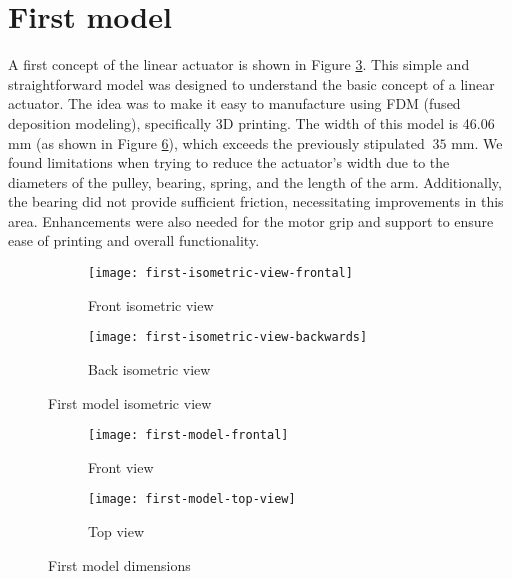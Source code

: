 \section{First model}

A first concept of the linear actuator is shown in Figure \ref{fig:first-isometric-view}. This simple and straightforward model was designed to understand the basic concept of a linear actuator. The idea was to make it easy to manufacture using FDM (fused deposition modeling), specifically 3D printing. The width of this model is 46.06 mm (as shown in Figure \ref{fig:first-model-dimensions}), which exceeds the previously stipulated $~35$ mm. We found limitations when trying to reduce the actuator's width due to the diameters of the pulley, bearing, spring, and the length of the arm. Additionally, the bearing did not provide sufficient friction, necessitating improvements in this area. Enhancements were also needed for the motor grip and support to ensure ease of printing and overall functionality.

\begin{figure}[H]
    \centering
    \begin{subfigure}[b]{0.4\textwidth}
        \texttt{[image: first-isometric-view-frontal]}
        \caption{Front isometric view}
        \label{fig:first-front-isometric-view}
    \end{subfigure}
    \begin{subfigure}[b]{0.4\textwidth}
        \texttt{[image: first-isometric-view-backwards]}
        \caption{Back isometric view}
        \label{fig:first-back-isometric-view}
    \end{subfigure}
    \caption{First model isometric view}
    \label{fig:first-isometric-view}
\end{figure}

\begin{figure}[H]
    \centering
    \begin{subfigure}[b]{0.272\textwidth}
        \texttt{[image: first-model-frontal]}
        \caption{Front view}
        \label{fig:first-model-frontal}
    \end{subfigure}
    \begin{subfigure}[b]{0.628\textwidth}
        \texttt{[image: first-model-top-view]}
        \caption{Top view}
        \label{fig:first-model-top-view}
    \end{subfigure}
    \caption{First model dimensions}
    \label{fig:first-model-dimensions}
\end{figure}

